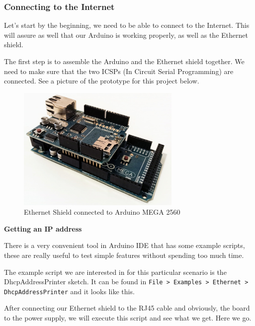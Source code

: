\subsubsection{Connecting to the Internet}
Let's start by the beginning, we need to be able to connect to the Internet. This will assure as well that our Arduino is working properly, as well as the Ethernet shield.

The first step is to assemble the Arduino and the Ethernet shield together. We need to make sure that the two ICSPs (In Circuit Serial Programming) are connected. See a picture of the prototype for this project below.

\begin{figure}[H]
    \centering
    \includegraphics[width=0.7\textwidth]{fig/ethernet-connected.jpg}
    \caption{Ethernet Shield connected to Arduino MEGA 2560}
    \label{fig:ethernet-connected}
\end{figure}

\vspace{7mm}

\textbf{Getting an IP address}

There is a very convenient tool in Arduino IDE that has some example scripts, these are really useful to test simple features without spending too much time.

The example script we are interested in for this particular scenario is the DhcpAddressPrinter sketch. It can be found in \verb|File > Examples > Ethernet > DhcpAddressPrinter| and it looks like this.

\vspace{5mm}



\vspace{7mm}

After connecting our Ethernet shield to the RJ45 cable and obviously, the board to the power supply, we will execute this script and see what we get. Here we go.


